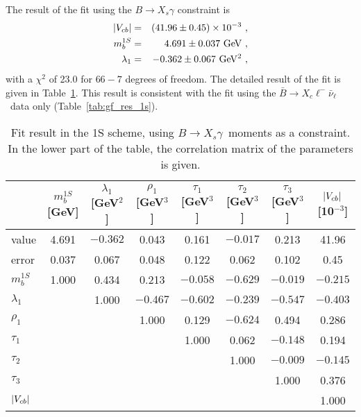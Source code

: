 The result of the fit using the $B\to X_s\gamma$ constraint is
\begin{eqnarray}
  |V_{cb}| & = & (41.96\pm 0.45)\times 10^{-3}~, \\
  m_b^{1S} & = & 4.691\pm 0.037~{\rm GeV}~, \\
  \lambda_1 & = & -0.362\pm 0.067~{\rm GeV^2}~,
\end{eqnarray}
with a $\chi^2$ of 23.0 for $66-7$ degrees of freedom. The detailed
result of the fit is given in Table~\ref{tab:gf_res_xsgamma_1s}. This
result is consistent with the fit using the $\bar B\to
X_c\ell^-\bar\nu_\ell$~data only (Table~\ref{tab:gf_res_1s}).
\begin{table}[!htb]
\caption{Fit result in the 1S scheme, using $B\to X_s\gamma$~moments
  as a constraint. In the lower part of the table, the correlation
  matrix of the parameters is given.} \label{tab:gf_res_xsgamma_1s}
\begin{center}
\begin{tabular}{|l|ccccccc|}
  \hline
  & $m_b^{1S}$ [GeV] & $\lambda_1$ [GeV$^2$] & $\rho_1$ [GeV$^3$] &
  $\tau_1$ [GeV$^3$] & $\tau_2$ [GeV$^3$] & $\tau_3$ [GeV$^3$] &
  $|V_{cb}|$ [10$^{-3}$]\\
  \hline \hline
  value & 4.691 & $-0.362$ & \phantom{$-$}0.043 &
  \phantom{$-$}0.161 & $-0.017$ & \phantom{$-$}0.213 &
  \phantom{$-$}41.96\\
  error & 0.037 & \phantom{$-$}0.067 & \phantom{$-$}0.048 &
  \phantom{$-$}0.122 & \phantom{$-$}0.062 & \phantom{$-$}0.102 &
  \phantom{$-$}0.45\\
  \hline
  $m_b^{1S}$ & 1.000 & \phantom{$-$}0.434 & \phantom{$-$}0.213 &
  $-0.058$ & $-0.629$ & $-0.019$ & $-0.215$\\
  $\lambda_1$ & & \phantom{$-$}1.000 & $-0.467$ & $-0.602$ & $-0.239$
  & $-0.547$ & $-0.403$\\
  $\rho_1$ & & & \phantom{$-$}1.000 & \phantom{$-$}0.129 & $-0.624$ &
  \phantom{$-$}0.494 & \phantom{$-$}0.286\\
  $\tau_1$ & & & & \phantom{$-$}1.000 & \phantom{$-$}0.062 & $-0.148$ &
  \phantom{$-$}0.194\\
  $\tau_2$ & & & & & \phantom{$-$}1.000 & $-0.009$ & $-0.145$\\
  $\tau_3$ & & & & & & \phantom{$-$}1.000 & \phantom{$-$}0.376\\
  $|V_{cb}|$ & & & & & & & \phantom{$-$}1.000\\
  \hline
\end{tabular}
\end{center}
\end{table}
